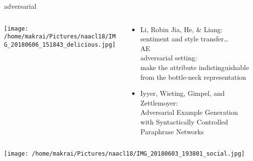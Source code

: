 \documentclass{beamer}
\begin{document}
\begin{frame}{adversarial}
  \begin{columns}
    \begin{column}{.35\textwidth}
      \centering 
      \texttt{[image: /home/makrai/Pictures/naacl18/IMG\_20180606\_151843\_delicious.jpg]}
    \end{column}
    \begin{column}{.65\textwidth}
      \begin{itemize}
        \item Li, Robin Jia, He, \& Liang: \\  sentiment and style transfer\dots 
          \\ AE
          \\ adversarial setting: \\  make the attribute indistinguishable from the
          bottle-neck representation
        \item Iyyer, Wieting, Gimpel, and Zettlemoyer: \\   
          Adversarial Example Generation 
          with Syntactically Controlled Paraphrase Networks
      \end{itemize}
    \end{column}
  \end{columns}
\end{frame}

 \begin{frame}
   \texttt{[image: /home/makrai/Pictures/naacl18/IMG\_20180603\_193801\_social.jpg]}
 \end{frame}

\end{document}
